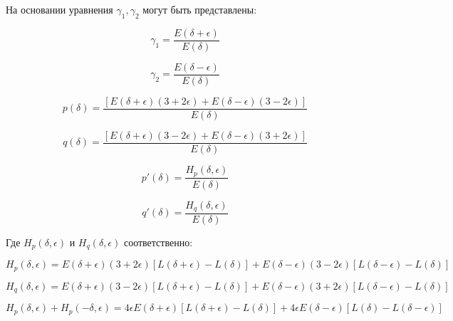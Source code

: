 На основании уравнения  $\gamma_1, \gamma_2$ могут быть представлены:

\begin{equation}
	\label{eq:equation79}
	\gamma_1 = \frac{E(\delta + \epsilon)}{E(\delta)} 
\end{equation}

\begin{equation}
	\label{eq:equation80}
	\gamma_2 = \frac{E(\delta - \epsilon)}{E(\delta)} 
\end{equation}

\begin{equation}
	\label{eq:equation81}
	p(\delta) = \frac{[E(\delta + \epsilon)(3 + 2 \epsilon) + E(\delta - \epsilon)(3 - 2 \epsilon)]}{E(\delta)}
\end{equation}

\begin{equation}
	\label{eq:equation82}
	q(\delta) = \frac{[E(\delta + \epsilon)(3 - 2 \epsilon) + E(\delta - \epsilon)(3 + 2 \epsilon)]}{E(\delta)}
\end{equation}

\begin{equation}
	\label{eq:equation83}
	p'(\delta) = \frac{H_{p}(\delta, \epsilon)}{E(\delta)}
\end{equation}

\begin{equation}
	\label{eq:equation84}
	q'(\delta) = \frac{H_{q}(\delta, \epsilon)}{E(\delta)}
\end{equation}

Где $H_{p}(\delta, \epsilon)$ и $H_{q}(\delta, \epsilon)$ соответственно:

\begin{equation}
	\label{eq:equation85}
	H_{p}(\delta, \epsilon) = E(\delta + \epsilon)(3 + 2 \epsilon) [L (\delta + \epsilon) - L(\delta)] + E(\delta - \epsilon)(3 - 2\epsilon) [L(\delta - \epsilon) - L(\delta)]
\end{equation}

\begin{equation}
	\label{eq:equation86}
	H_{q}(\delta, \epsilon) = E(\delta + \epsilon)(3 - 2 \epsilon) [L (\delta + \epsilon) - L(\delta)] + E(\delta - \epsilon)(3 + 2\epsilon)[L(\delta - \epsilon) - L(\delta)]
\end{equation}

\begin{equation}
	\label{eq:equation87}
	H_{p}(\delta, \epsilon) + H_{p}(- \delta, \epsilon) = 4 \epsilon E (\delta + \epsilon) [L(\delta + \epsilon) - L(\delta)] + 4 \epsilon E (\delta - \epsilon)[L(\delta) - L (\delta - \epsilon)] 
\end{equation}

